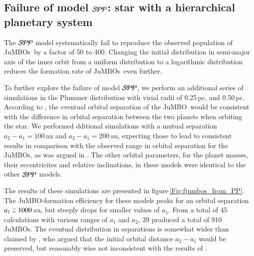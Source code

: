 \documentclass[submission,phys]{lib/SciPost}
\def\apgt{\ {\raise-.5ex\hbox{$\buildrel>\over\sim$}}\ }
\newcommand{\jumbo}{\mbox{JuMBO}}
\newcommand{\jumbos}{\mbox{JuMBOs}}
\begin{document}
\subsection{Failure of model ${\cal SPP}$: star with a hierarchical planetary system}\label{Sect:Failure_SPP}

The ${\cal SPP}$ model systematically fail to reproduce the observed
population of \jumbos\, by a factor of 50 to 400. Changing the initial
distribution in semi-major axis of the inner orbit from a uniform
distribution to a logarithmic distribution reduces the formation rate
of \jumbos\, even further.

To further explore the failure of model ${\cal SPP}$, we perform an
additional series of simulations in the Plummer distribution with
virial radii of 0.25\,pc, and 0.50\,pc.  According to
\cite{2023arXiv231006016W}, the eventual orbital separation of the
\jumbo\, would be consistent with the difference in orbital separation
between the two planets when orbiting the star.  We performed
dditional simulations with a mutual separation $a_2-a_1 = 100$\,au and
$a_2-a_1 = 200$\,au, expecting those to lead to consistent results in
comparison with the observed range in orbital separation for the
\jumbos, as was argued in \cite{2023arXiv231006016W}.  The other
orbital parameters, for the planet masses, their eccentricites and
relative inclinations, in these models were identical to the other
${\cal SPP}$ models.

The results of these simulations are presented in
figure\,\ref{Fig:fjumbos_from_PP}.  The \jumbo-formation efficiency
for these models peaks for an orbital separation $a_1 \apgt 1000$\,au,
but steeply drops for smaller values of $a_1$.  From a total of 45
calculations with various ranges of $a_1$ and $a_2$, 39 produced a
total of 910 \jumbos.  The eventual distribution in separations is
somewhat wider than claimed by \cite{2023arXiv231006016W}, who argued
that the initial orbital distance $a_2-a_1$ would be preserved, but
reasonably wise not inconsistent with the results of
\cite{2023arXiv231006016W}.
\end{document}
